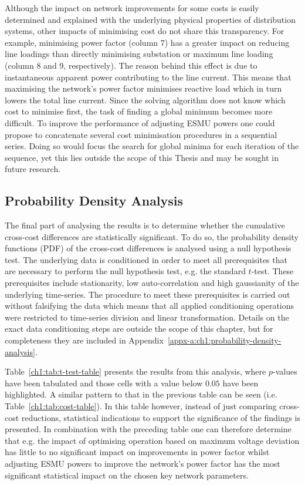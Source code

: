 Although the impact on network improvements for some costs is easily determined and explained with the underlying physical properties of distribution systems, other impacts of minimising cost do not share this transparency.
For example, minimising power factor (column 7) has a greater impact on reducing line loadings than directly minimising substation or maximum line loading (column 8 and 9, respectively).
The reason behind this effect is due to instantaneous apparent power contributing to the line current.
This means that maximising the network's power factor minimises reactive load which in turn lowers the total line current.
Since the solving algorithm does not know which cost to minimise first, the task of finding a global minimum becomes more difficult.
To improve the performance of adjusting ESMU powers one could propose to concatenate several cost minimisation procedures in a sequential series.
Doing so would focus the search for global minima for each iteration of the sequence, yet this lies outside the scope of this Thesis and may be sought in future research.

\subsection{Probability Density Analysis}
\label{ch1:subsec:probability-density-analysis}

The final part of analysing the results is to determine whether the cumulative cross-cost differences are statistically significant.
To do so, the probability density functions (PDF) of the cross-cost differences is analysed using a null hypothesis test.
The underlying data is conditioned in order to meet all prerequisites that are necessary to perform the null hypothesis test, e.g. the standard $t$-test.
These prerequisites include stationarity, low auto-correlation and high gaussianity of the underlying time-series.
The procedure to meet these prerequisites is carried out without falsifying the data which means that all applied conditioning operations were restricted to time-series division and linear transformation.
Details on the exact data conditioning steps are outside the scope of this chapter, but for completeness they are included in Appendix~\ref{appx-a:ch1:probability-density-analysis}.



Table~\ref{ch1:tab:t-test-table} presents the results from this analysis, where $p$-values have been tabulated and those cells with a value below $0.05$ have been highlighted.
A similar pattern to that in the previous table can be seen (i.e. Table~\ref{ch1:tab:cost-table}).
In this table however, instead of just comparing cross-cost reductions, statistical indications to support the significance of the findings is presented.
In combination with the preceding table one can therefore determine that e.g. the impact of optimising operation based on maximum voltage deviation has little to no significant impact on improvements in power factor whilst adjusting ESMU powers to improve the network's power factor has the most significant statistical impact on the chosen key network parameters.
